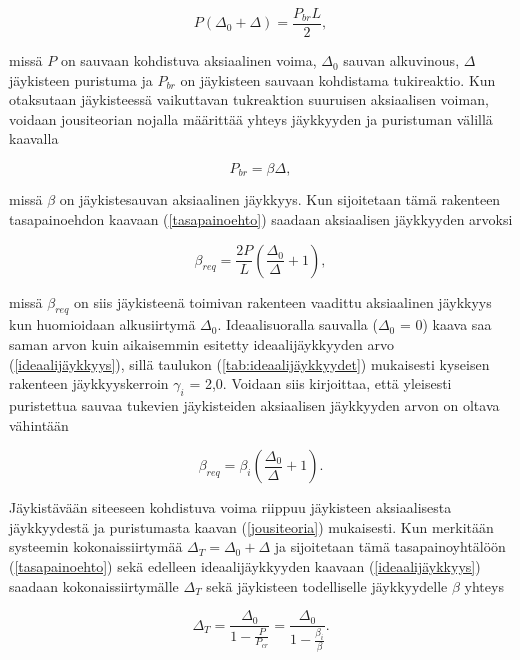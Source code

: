 \documentclass[12pt]{article}
\newenvironment{content}{\pagenumbering{arabic}}{}
\begin{document}
\begin{content}
\begin{equation}
\label{tasapainoehto}
P (\Delta_0 + \Delta) = \frac{P_{br} L}{2},
\end{equation}

missä $P$ on sauvaan kohdistuva aksiaalinen voima, $\Delta_0$ sauvan alkuvinous, $\Delta$ jäykisteen puristuma ja $P_{br}$ on jäykisteen sauvaan kohdistama tukireaktio. Kun otaksutaan jäykisteessä vaikuttavan tukreaktion suuruisen aksiaalisen voiman, voidaan jousiteorian nojalla määrittää yhteys jäykkyyden ja puristuman välillä kaavalla

\begin{equation}
\label{jousiteoria}
P_{br} = \beta \Delta,
\end{equation}

missä $\beta$ on jäykistesauvan aksiaalinen jäykkyys. Kun sijoitetaan tämä rakenteen tasapainoehdon kaavaan (\ref{tasapainoehto}) saadaan aksiaalisen jäykkyyden arvoksi

\begin{equation}
\label{breq}
\beta_{req} = \frac{2 P}{L} (\frac{\Delta_0}{\Delta} + 1),
\end{equation}

missä $\beta_{req}$ on siis jäykisteenä toimivan rakenteen vaadittu aksiaalinen jäykkyys kun huomioidaan alkusiirtymä $\Delta_0$. Ideaalisuoralla sauvalla ($\Delta_0$ = 0) kaava saa saman arvon kuin aikaisemmin esitetty ideaalijäykkyyden arvo (\ref{ideaalijäykkyys}), sillä taulukon (\ref{tab:ideaalijäykkyydet}) mukaisesti kyseisen rakenteen jäykkyyskerroin $\gamma_i$ = 2,0. Voidaan siis kirjoittaa, että yleisesti puristettua sauvaa tukevien jäykisteiden aksiaalisen jäykkyyden arvon on oltava vähintään

\begin{equation}
\label{breq_2}
\beta_{req} = \beta_i (\frac{\Delta_0}{\Delta} + 1).
\end{equation}

Jäykistävään siteeseen kohdistuva voima riippuu jäykisteen aksiaalisesta jäykkyydestä ja puristumasta kaavan (\ref{jousiteoria}) mukaisesti. Kun merkitään systeemin kokonaissiirtymää $\Delta_T = \Delta_0 + \Delta$ ja sijoitetaan tämä tasapainoyhtälöön (\ref{tasapainoehto}) sekä edelleen ideaalijäykkyyden kaavaan (\ref{ideaalijäykkyys}) saadaan kokonaissiirtymälle $\Delta_T$ sekä jäykisteen todelliselle jäykkyydelle $\beta$ yhteys

\begin{equation}
\label{delta_tot}
\Delta_T = \frac{\Delta_0}{1-\frac{P}{P_{cr}}} = \frac{\Delta_0}{1-\frac{\beta_i}{\beta}}.
\end{equation}


\end{content}
\end{document}
